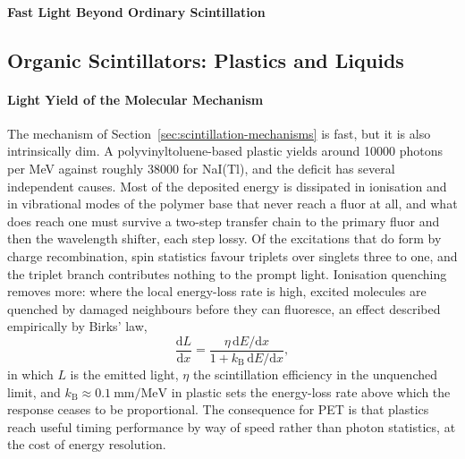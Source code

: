 \paragraph{Fast Light Beyond Ordinary Scintillation}

\subsection{Organic Scintillators: Plastics and Liquids}
\label{sec:organic}

\paragraph{Light Yield of the Molecular Mechanism}
The mechanism of Section~\ref{sec:scintillation-mechanisms} is fast, but it is also intrinsically dim.
A polyvinyltoluene-based plastic yields around \num{10000} photons per \unit{\mega\electronvolt} against roughly \num{38000} for NaI(Tl), and the deficit has several independent causes.
Most of the deposited energy is dissipated in ionisation and in vibrational modes of the polymer base that never reach a fluor at all, and what does reach one must survive a two-step transfer chain to the primary fluor and then the wavelength shifter, each step lossy.
Of the excitations that do form by charge recombination, spin statistics favour triplets over singlets three to one, and the triplet branch contributes nothing to the prompt light.
Ionisation quenching removes more: where the local energy-loss rate is high, excited molecules are quenched by damaged neighbours before they can fluoresce, an effect described empirically by Birks' law,
\begin{equation}
	\frac{\mathrm{d}L}{\mathrm{d}x} = \frac{\eta \, \mathrm{d}E/\mathrm{d}x}{1 + k_\mathrm{B} \, \mathrm{d}E/\mathrm{d}x},
	\label{eq:birks}
\end{equation}
in which $L$ is the emitted light, $\eta$ the scintillation efficiency in the unquenched limit, and $k_\mathrm{B} \approx \qty{0.1}{\milli\metre\per\mega\electronvolt}$ in plastic sets the energy-loss rate above which the response ceases to be proportional.
The consequence for PET is that plastics reach useful timing performance by way of speed rather than photon statistics, at the cost of energy resolution.

